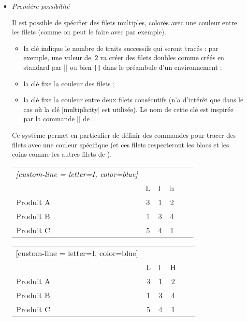 \documentclass[dvipsnames]{article}%
\begin{document}
\begin{itemize}
\item \emph{Première possibilité}\par\nobreak

Il est possible de spécifier des filets multiples, colorés avec une couleur
entre les filets (comme on peut le faire avec  par exemple).

\begin{itemize}
\item la clé  indique le nombre de traits successifs
qui seront tracés : par exemple, une valeur de~$2$ va créer des filets doubles
comme créés en standard par |\hline\hline| ou bien \verb+||+ dans le préambule
d'un environnement ;

\item la clé  fixe la couleur des filets ;

\item la clé  fixe la couleur entre deux filets consécutifs (n'a
d'intérêt que dans le cas où la clé |multiplicity| est utilisée). Le nom de
cette clé est inspirée par la commande |\doublerulesepcolor| de .
\end{itemize}

\medskip
Ce système permet en particulier de définir des commandes pour tracer des filets
avec une couleur spécifique (et ces filets respecteront les blocs et les coins
comme les autres filets de ).

\medskip
\begin{Code}
\begin{NiceTabular}{lcIcIc}\emph{[custom-line = {letter=I, color=blue}]}
\hline
          &  \\
          & L & l & h \\
\hline
Produit A & 3 & 1 & 2 \\
Produit B & 1 & 3 & 4 \\
Produit C & 5 & 4 & 1 \\
\hline
\end{NiceTabular}
\end{Code}


\begin{center}
\begin{NiceTabular}{lcIcIc}[custom-line = {letter=I, color=blue}]
\hline
          &  \\
          & L & l & H \\
\hline
Produit A & 3 & 1 & 2 \\
Produit B & 1 & 3 & 4 \\
Produit C & 5 & 4 & 1 \\
\hline
\end{NiceTabular}
\end{center}



\end{itemize}
\end{document}
